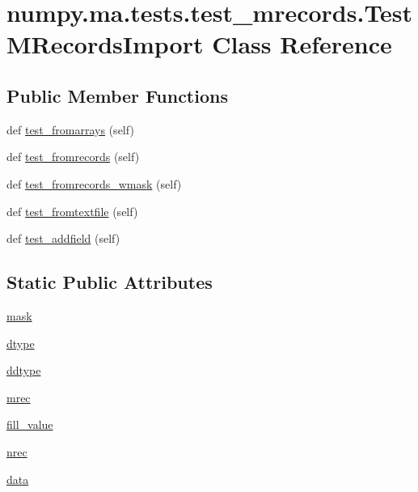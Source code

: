 \hypertarget{classnumpy_1_1ma_1_1tests_1_1test__mrecords_1_1TestMRecordsImport}{}\section{numpy.\+ma.\+tests.\+test\+\_\+mrecords.\+Test\+M\+Records\+Import Class Reference}
\label{classnumpy_1_1ma_1_1tests_1_1test__mrecords_1_1TestMRecordsImport}
\subsection*{Public Member Functions}
\begin{DoxyCompactItemize}
\item 
def \hyperlink{classnumpy_1_1ma_1_1tests_1_1test__mrecords_1_1TestMRecordsImport_afd8f9e47ccd7420504caa6e3092c7170}{test\+\_\+fromarrays} (self)
\item 
def \hyperlink{classnumpy_1_1ma_1_1tests_1_1test__mrecords_1_1TestMRecordsImport_a3cb60e001bc3d3a1f0f2c2f94b4130b0}{test\+\_\+fromrecords} (self)
\item 
def \hyperlink{classnumpy_1_1ma_1_1tests_1_1test__mrecords_1_1TestMRecordsImport_aefd42343750c7abd522644d4a6967099}{test\+\_\+fromrecords\+\_\+wmask} (self)
\item 
def \hyperlink{classnumpy_1_1ma_1_1tests_1_1test__mrecords_1_1TestMRecordsImport_a1974bc20c55eb3094417b22ae26653cb}{test\+\_\+fromtextfile} (self)
\item 
def \hyperlink{classnumpy_1_1ma_1_1tests_1_1test__mrecords_1_1TestMRecordsImport_a5ba7146cd378c999480fdc1c7bf9c401}{test\+\_\+addfield} (self)
\end{DoxyCompactItemize}
\subsection*{Static Public Attributes}
\begin{DoxyCompactItemize}
\item 
\hyperlink{classnumpy_1_1ma_1_1tests_1_1test__mrecords_1_1TestMRecordsImport_a37512791a43b7f747cfd8c2305ac3d6d}{mask}
\item 
\hyperlink{classnumpy_1_1ma_1_1tests_1_1test__mrecords_1_1TestMRecordsImport_af0c5ba01a60407afeccbd2768575a11d}{dtype}
\item 
\hyperlink{classnumpy_1_1ma_1_1tests_1_1test__mrecords_1_1TestMRecordsImport_a1017db81cf28621ab6a4cf26fe6b905e}{ddtype}
\item 
\hyperlink{classnumpy_1_1ma_1_1tests_1_1test__mrecords_1_1TestMRecordsImport_aa77221ee956f060d5188709618d2f35e}{mrec}
\item 
\hyperlink{classnumpy_1_1ma_1_1tests_1_1test__mrecords_1_1TestMRecordsImport_a790e6482dd886c373d107c15dca3f4a5}{fill\+\_\+value}
\item 
\hyperlink{classnumpy_1_1ma_1_1tests_1_1test__mrecords_1_1TestMRecordsImport_a5a17f41b831dd95792e3daaf5c9a0515}{nrec}
\item 
\hyperlink{classnumpy_1_1ma_1_1tests_1_1test__mrecords_1_1TestMRecordsImport_ab2c7c20768b8ff16968d285a7f9cc5bc}{data}
\end{DoxyCompactItemize}


